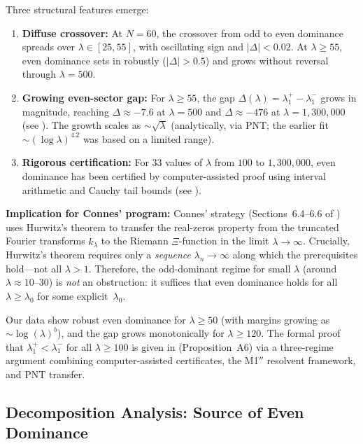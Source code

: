 \documentclass[12pt,a4paper]{article}
\theoremstyle{definition}
\theoremstyle{remark}
\begin{document}
Three structural features emerge:

\begin{enumerate}
  \item \textbf{Diffuse crossover:} At $N=60$, the crossover from odd to even dominance spreads over $\lambda \in [25, 55]$, with oscillating sign and $|\Delta| < 0.02$. At $\lambda \geq 55$, even dominance sets in robustly ($|\Delta| > 0.5$) and grows without reversal through $\lambda = 500$.

  \item \textbf{Growing even-sector gap:} For $\lambda \geq 55$, the gap $\Delta(\lambda) = \lambda_1^+ - \lambda_1^-$ grows in magnitude, reaching $\Delta \approx -7.6$ at $\lambda = 500$ and $\Delta \approx -476$ at $\lambda = 1{,}300{,}000$ (see ). The growth scales as $\sim\!\sqrt{\lambda}$ (analytically, via PNT; the earlier fit $\sim\!(\log\lambda)^{4.2}$ was based on a limited range).

  \item \textbf{Rigorous certification:} For $33$ values of $\lambda$ from $100$ to $1{,}300{,}000$, even dominance has been certified by computer-assisted proof using interval arithmetic and Cauchy tail bounds (see ).
\end{enumerate}

\textbf{Implication for Connes' program:} Connes' strategy (Sections~6.4--6.6 of \cite{Connes2026}) uses Hurwitz's theorem to transfer the real-zeros property from the truncated Fourier transforms $\hat{k}_\lambda$ to the Riemann $\Xi$-function in the limit $\lambda \to \infty$. Crucially, Hurwitz's theorem requires only a \emph{sequence} $\lambda_n \to \infty$ along which the prerequisites hold---not all $\lambda > 1$. Therefore, the odd-dominant regime for small $\lambda$ (around $\lambda \approx 10$--$30$) is \emph{not} an obstruction: it suffices that even dominance holds for all $\lambda \geq \lambda_0$ for some explicit~$\lambda_0$.

Our data show robust even dominance for $\lambda \geq 50$ (with margins growing as $\sim \log(\lambda)^b$), and the gap grows monotonically for $\lambda \geq 120$. The formal proof that $\lambda_1^+ < \lambda_1^-$ for all $\lambda \geq 100$ is given in  (Proposition~A6) via a three-regime argument combining computer-assisted certificates, the M1$''$ resolvent framework, and PNT transfer.

\subsection{Decomposition Analysis: Source of Even Dominance}
\end{document}
